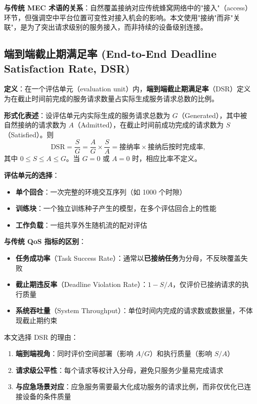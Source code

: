 \textbf{与传统 MEC 术语的关系}：自然覆盖接纳对应传统蜂窝网络中的"接入"（access）环节，但强调空中平台位置可变性对接入机会的影响。本文使用"接纳"而非"关联"，是为了突出请求级别的服务接入，而非持续的设备级别连接。

\subsection{端到端截止期满足率 (End-to-End Deadline Satisfaction Rate, DSR)}
\label{sec:ch2-term-dsr}

\textbf{定义}：在一个评估单元（evaluation unit）内，\textbf{端到端截止期满足率}（DSR）定义为在截止时间前完成的服务请求数量占实际生成服务请求总数的比例。

\textbf{形式化表述}：设评估单元内实际生成的服务请求总数为 $G$（Generated），其中被自然接纳的请求数为 $A$（Admitted），在截止时间前成功完成的请求数为 $S$（Satisfied）。则
\begin{equation}
    \mathrm{DSR} = \frac{S}{G} = \frac{A}{G} \times \frac{S}{A} = \text{接纳率} \times \text{接纳后按时完成率},
    \label{eq:ch2-term-dsr}
\end{equation}
其中 $0 \leq S \leq A \leq G$。当 $G = 0$ 或 $A = 0$ 时，相应比率不定义。

\textbf{评估单元的选择}：
\begin{itemize}
    \item \textbf{单个回合}：一次完整的环境交互序列（如 1000 个时隙）
    \item \textbf{训练块}：一个独立训练种子产生的模型，在多个评估回合上的性能
    \item \textbf{工作负载}：一组共享外生随机流的配对评估
\end{itemize}

\textbf{与传统 QoS 指标的区别}：
\begin{itemize}
    \item \textbf{任务成功率}（Task Success Rate）：通常以\textbf{已接纳任务}为分母，不反映覆盖失败
    \item \textbf{截止期违反率}（Deadline Violation Rate）：$1 - S/A$，仅评价已接纳请求的执行质量
    \item \textbf{系统吞吐量}（System Throughput）：单位时间内完成的请求数或数据量，不体现截止期约束
\end{itemize}

本文选择 DSR 的理由：
\begin{enumerate}
    \item \textbf{端到端视角}：同时评价空间部署（影响 $A/G$）和执行质量（影响 $S/A$）
    \item \textbf{请求级公平性}：每个请求等权计入分母，避免只服务少量易完成请求
    \item \textbf{与应急场景对应}：应急服务需要最大化成功服务的请求比例，而非仅优化已连接设备的条件质量
\end{enumerate}

